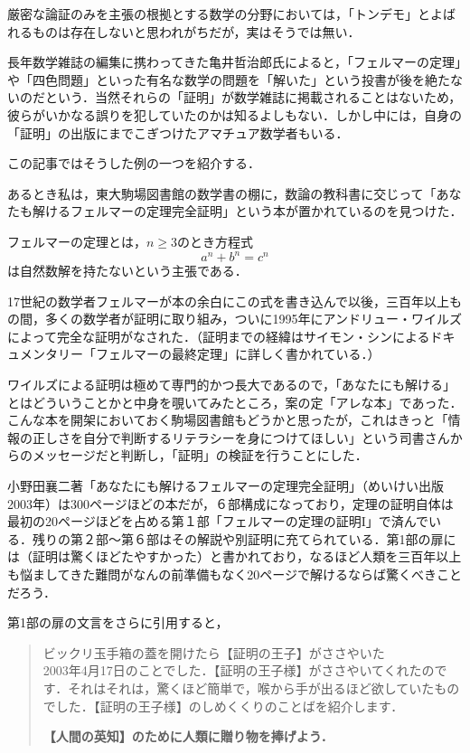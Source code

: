 
厳密な論証のみを主張の根拠とする数学の分野においては，「トンデモ」とよばれるものは存在しないと思われがちだが，実はそうでは無い．

長年数学雑誌の編集に携わってきた亀井哲治郎氏によると，「フェルマーの定理」や「四色問題」といった有名な数学の問題を「解いた」という投書が後を絶たないのだという．当然それらの「証明」が数学雑誌に掲載されることはないため，彼らがいかなる誤りを犯していたのかは知るよしもない．しかし中には，自身の「証明」の出版にまでこぎつけたアマチュア数学者もいる．

この記事ではそうした例の一つを紹介する．

あるとき私は，東大駒場図書館の数学書の棚に，数論の教科書に交じって「あなたも解けるフェルマーの定理完全証明」という本が置かれているのを見つけた．

フェルマーの定理とは，$n\geq 3$のとき方程式
\[a^n+b^n=c^n\]
は自然数解を持たないという主張である．

17世紀の数学者フェルマーが本の余白にこの式を書き込んで以後，三百年以上もの間，多くの数学者が証明に取り組み，ついに1995年にアンドリュー・ワイルズによって完全な証明がなされた．（証明までの経緯はサイモン・シンによるドキュメンタリー「フェルマーの最終定理」に詳しく書かれている．）

ワイルズによる証明は極めて専門的かつ長大であるので，「あなたにも解ける」とはどういうことかと中身を覗いてみたところ，案の定「アレな本」であった．こんな本を開架においておく駒場図書館もどうかと思ったが，これはきっと「情報の正しさを自分で判断するリテラシーを身につけてほしい」という司書さんからのメッセージだと判断し，「証明」の検証を行うことにした．


小野田襄二著「あなたにも解けるフェルマーの定理完全証明」（めいけい出版　2003年）は300ページほどの本だが，６部構成になっており，定理の証明自体は最初の20ページほどを占める第１部「フェルマーの定理の証明I」で済んでいる．残りの第２部～第６部はその解説や別証明に充てられている．第1部の扉には（証明は驚くほどたやすかった）と書かれており，なるほど人類を三百年以上も悩ましてきた難問がなんの前準備もなく20ページで解けるならば驚くべきことだろう．

第1部の扉の文言をさらに引用すると，

\begin{quotation}
ビックリ玉手箱の蓋を開けたら【証明の王子】がささやいた\\

2003年4月17日のことでした．【証明の王子様】がささやいてくれたのです．それはそれは，驚くほど簡単で，喉から手が出るほど欲していたものでした．【証明の王子様】のしめくくりのことばを紹介します．
\begin{center}
\textbf{【人間の英知】のために人類に贈り物を捧げよう．}
\end{center}
\end{quotation}


